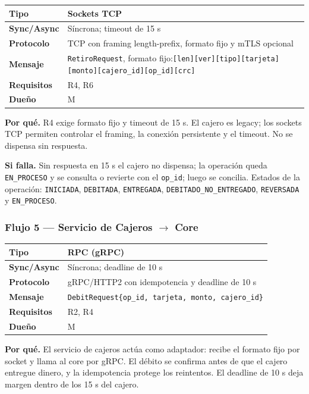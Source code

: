 \documentclass[11pt,a4paper]{article}
\begin{document}
\begin{tabular}{|l|p{9.5cm}|}
\hline
\textbf{Tipo} & Sockets TCP \\ \hline
\textbf{Sync/Async} & Síncrona; timeout de 15 s \\ \hline
\textbf{Protocolo} & TCP con framing length-prefix, formato fijo y mTLS opcional \\ \hline
\textbf{Mensaje} & \texttt{RetiroRequest}, formato fijo:\newline \texttt{[len][ver][tipo][tarjeta][monto]}\newline \texttt{[cajero\_id][op\_id][crc]} \\ \hline
\textbf{Requisitos} & R4, R6 \\ \hline
\textbf{Dueño} & M \\ \hline
\end{tabular}

\medskip
\textbf{Por qué.} R4 exige formato fijo y timeout de 15 s. El cajero es legacy; los sockets TCP
permiten controlar el framing, la conexión persistente y el timeout. No se dispensa sin
respuesta.

\textbf{Si falla.} Sin respuesta en 15 s el cajero no dispensa; la operación queda
\texttt{EN\_PROCESO} y se consulta o revierte con el \texttt{op\_id}; luego se concilia. Estados
de la operación: \texttt{INICIADA}, \texttt{DEBITADA}, \texttt{ENTREGADA},
\texttt{DEBITADO\_NO\_ENTREGADO}, \texttt{REVERSADA} y \texttt{EN\_PROCESO}.

\subsubsection*{Flujo 5 --- Servicio de Cajeros $\rightarrow$ Core}

\begin{tabular}{|l|p{9.5cm}|}
\hline
\textbf{Tipo} & RPC (gRPC) \\ \hline
\textbf{Sync/Async} & Síncrona; deadline de 10 s \\ \hline
\textbf{Protocolo} & gRPC/HTTP2 con idempotencia y deadline de 10 s \\ \hline
\textbf{Mensaje} & \texttt{DebitRequest\{op\_id, tarjeta, monto, cajero\_id\}} \\ \hline
\textbf{Requisitos} & R2, R4 \\ \hline
\textbf{Dueño} & M \\ \hline
\end{tabular}

\medskip
\textbf{Por qué.} El servicio de cajeros actúa como adaptador: recibe el formato fijo por socket
y llama al core por gRPC. El débito se confirma antes de que el cajero entregue dinero, y la
idempotencia protege los reintentos. El deadline de 10 s deja margen dentro de los 15 s del
cajero.
\end{document}
